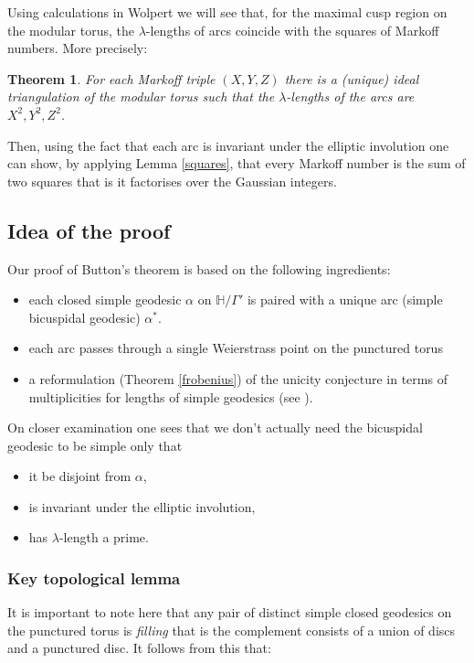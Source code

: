 \documentclass[12pt,a4paper]{amsart}
\newtheorem{thm}{Theorem}[section]
\def\HH{\mathbb{H}}
\def\xx{\HH/\Gamma'}
\begin{document}
 Using calculations in Wolpert \cite{saw} we will see that, for the maximal
 cusp region on the modular torus,  the $\lambda$-lengths of arcs coincide with
 the squares of Markoff numbers. More precisely:
 
\begin{thm}\label{thm:triangulation lengths}
For each  Markoff triple $(X,Y,Z)$
there is a (unique) ideal triangulation of the modular torus
such that the $\lambda$-lengths of the arcs are 
$X^2,Y^2,Z^2$.
\end{thm}

 Then, using the fact that each arc is invariant under the elliptic involution
 one can show, by applying Lemma \ref{squares}, that every Markoff number is
 the sum of two squares that is it factorises over the Gaussian integers.

 \subsection{Idea of the proof}

Our proof of Button's theorem is based on the following ingredients: 
\begin{itemize}
\item each closed simple geodesic $\alpha$ on $\xx$ is paired with a unique arc (simple bicuspidal geodesic) $\alpha^*$. 
\item each arc passes through a single Weierstrass point on the punctured torus
\item a reformulation (Theorem \ref{frobenius}) of the unicity conjecture in terms of multiplicities for lengths of simple geodesics (see \cite{mcp}).
\end{itemize}

\noindent
On closer examination one sees that we don't actually need the bicuspidal
geodesic to be simple only that 
\begin{itemize}
	\item it be disjoint from $\alpha$,
	\item is invariant under the elliptic involution, 
	\item has $\lambda$-length a prime.
\end{itemize}


\subsubsection{Key topological lemma}
It is important to note here that any pair of
distinct simple closed geodesics on the punctured torus is \textit{filling}
that is the complement consists of a union of discs and a punctured disc. It
follows from this that:
\end{document}
